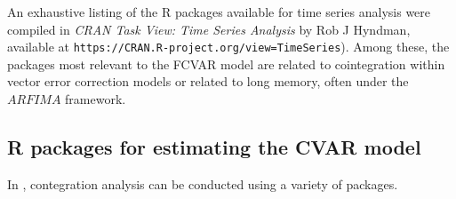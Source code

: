 \documentclass[article]{jss}
\newcommand{\fct}[1]{\code{#1()}}
\begin{document}


An exhaustive listing of the R packages available for time series analysis were compiled in 
\emph{CRAN Task View: Time Series Analysis} by Rob J Hyndman, 
available at \verb|https://CRAN.R-project.org/view=TimeSeries|). 
% 
Among these, the packages most relevant to the FCVAR model are related to cointegration within vector error correction models or related to long memory, often under the $ARFIMA$ framework. 

\subsection{R packages for estimating the CVAR model}


In  \citep{R}, contegration analysis can be conducted using a variety of packages. 
\end{document}
